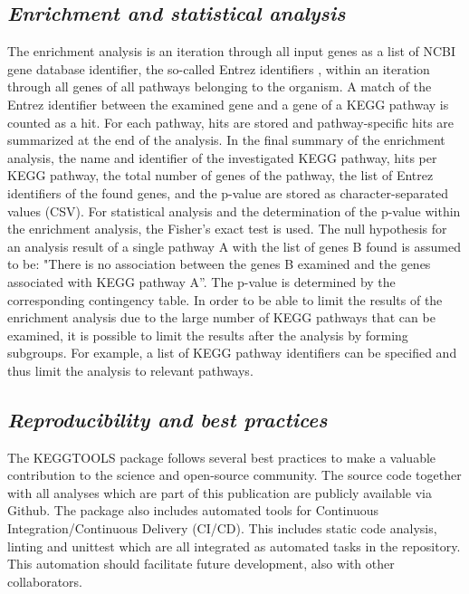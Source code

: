 \documentclass[11pt,a4paper]{article}
\begin{document}
\subsection*{\textit{Enrichment and statistical analysis}}

The enrichment analysis is an iteration through all input genes as a list of NCBI gene database identifier, the so-called Entrez
identifiers \cite{entrez}, within an iteration through all genes of all pathways belonging to the
organism. A match of the Entrez identifier between the examined gene and a gene of
a KEGG pathway is counted as a hit. For each pathway, hits are stored and pathway-specific
hits are summarized at the end of the analysis. In the final summary of the enrichment
analysis, the name and identifier of the investigated KEGG pathway, hits per KEGG pathway,
the total number of genes of the pathway, the list of Entrez identifiers of the found
genes, and the p-value are stored as character-separated values (CSV). For statistical
analysis and the determination of the p-value within the enrichment analysis, the
Fisher's exact test is used. The null hypothesis for an analysis result of a single
pathway A with the list of genes B found is assumed to be: "There is no association
between the genes B examined and the genes associated with KEGG pathway A”. The p-value
is determined by the corresponding contingency table. In order to be able to limit the
results of the enrichment analysis due to the large number of KEGG pathways that can be
examined, it is possible to limit the results after the analysis by forming subgroups.
For example, a list of KEGG pathway identifiers can be specified and thus limit
the analysis to relevant pathways.


\subsection*{\textit{Reproducibility and best practices}}

The KEGGTOOLS package follows several best practices to make a valuable contribution
to the science and open-source community. The source code together with all analyses
which are part of this publication are publicly available via Github. The package also
includes automated tools for Continuous Integration/Continuous Delivery (CI/CD).
This includes static code analysis, linting and unittest which are all integrated as
automated tasks in the repository. This automation should facilitate future development,
also with other collaborators.
\end{document}
